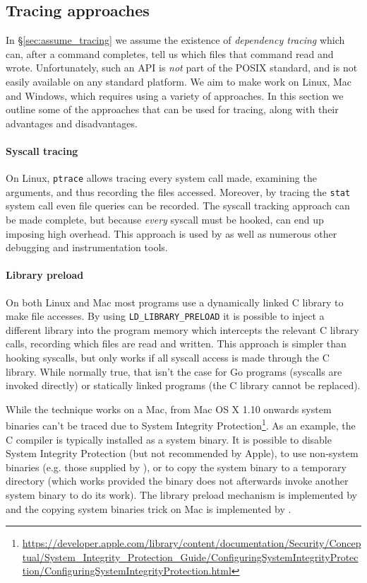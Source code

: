 \subsection{Tracing approaches}
\label{sec:tracing}

In \S\ref{sec:assume_tracing} we assume the existence of \emph{dependency tracing} which can, after a command completes, tell us which files that command read and wrote. Unfortunately, such an API is \emph{not} part of the POSIX standard, and is not easily available on any standard platform. We aim to make \Rattle work on Linux, Mac and Windows, which requires using a variety of approaches. In this section we outline some of the approaches that can be used for tracing, along with their advantages and disadvantages.

\paragraph{Syscall tracing} On Linux, \texttt{ptrace} allows tracing every system call made, examining the arguments, and thus recording the files accessed. Moreover, by tracing  the \texttt{stat} system call even file queries can be recorded. The syscall tracking approach can be made complete, but because \emph{every} syscall must be hooked, can end up imposing high overhead. This approach is used by \Bigbro \cite{bigbro} as well as numerous other debugging and instrumentation tools.

\paragraph{Library preload} On both Linux and Mac most programs use a dynamically linked C library to make file accesses. By using \texttt{LD\_LIBRARY\_PRELOAD} it is possible to inject a different library into the program memory which intercepts the relevant C library calls, recording which files are read and written. This approach is simpler than hooking syscalls, but only works if all syscall access is made through the C library. While normally true, that isn't the case for Go programs \cite{go} (syscalls are invoked directly) or statically linked programs (the C library cannot be replaced).

While the technique works on a Mac, from Mac OS X 1.10 onwards system binaries can't be traced due to System Integrity Protection\footnote{\url{https://developer.apple.com/library/content/documentation/Security/Conceptual/System_Integrity_Protection_Guide/ConfiguringSystemIntegrityProtection/ConfiguringSystemIntegrityProtection.html}}. As an example, the C compiler is typically installed as a system binary. It is possible to disable System Integrity Protection (but not recommended by Apple), to use non-system binaries (e.g. those supplied by \Nix \cite{nix}), or to copy the system binary to a temporary directory (which works provided the binary does not afterwards invoke another system binary to do its work). The library preload mechanism is implemented by \Fsatrace \cite{fsatrace} and the copying system binaries trick on Mac is implemented by \Shake \cite{shake}.

